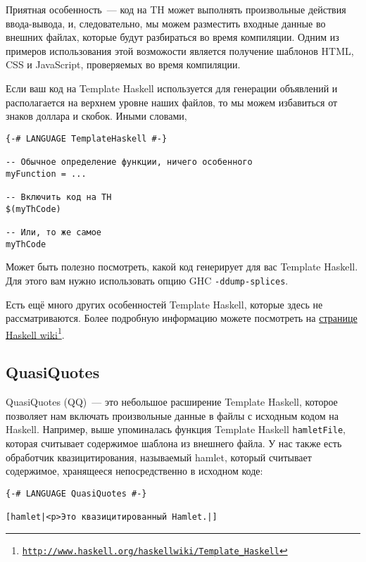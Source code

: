 Приятная особенность~--- код на TH может выполнять произвольные действия ввода-вывода, и, следовательно, мы можем разместить входные данные во внешних файлах, которые будут разбираться во время компиляции. Одним из примеров использования этой возможости является получение шаблонов HTML, CSS и JavaScript, проверяемых во время компиляции.

Если ваш код на Template Haskell используется для генерации объявлений и располагается на верхнем уровне наших файлов, то мы можем избавиться от знаков доллара и скобок. Иными словами,

\begin{lstlisting}
{-# LANGUAGE TemplateHaskell #-}

-- Обычное определение функции, ничего особенного
myFunction = ...

-- Включить код на TH
$(myThCode)

-- Или, то же самое
myThCode
\end{lstlisting}

Может быть полезно посмотреть, какой код генерирует для вас Template Haskell. Для этого вам нужно использовать опцию GHC \texttt{-ddump-splices}.

\begin{remark}
Есть ещё много других особенностей Template Haskell, которые здесь не рассматриваются. Более подробную информацию можете посмотреть на \href{http://www.haskell.org/haskellwiki/Template\_Haskell}{странице Haskell wiki}\footnote{\href{http://www.haskell.org/haskellwiki/Template\_Haskell}{\texttt{http://www.haskell.org/haskellwiki/Template\_Haskell}}}.
\end{remark}

\subsection{QuasiQuotes}

QuasiQuotes (QQ)~--- это небольшое расширение Template Haskell, которое позволяет нам включать произвольные данные в файлы с исходным кодом на Haskell. Например, выше упоминалась функция Template Haskell \lstinline'hamletFile', которая считывает содержимое шаблона из внешнего файла. У нас также есть обработчик квазицитирования, называемый hamlet, который считывает содержимое, хранящееся непосредственно в исходном коде:

\begin{lstlisting}
{-# LANGUAGE QuasiQuotes #-}

[hamlet|<p>Это квазицитированный Hamlet.|]
\end{lstlisting}

